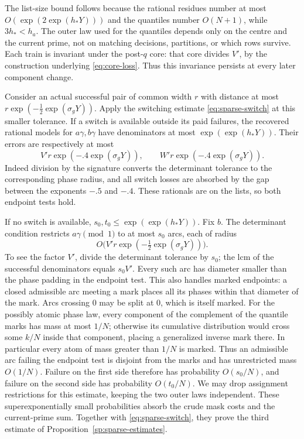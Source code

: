 The list-size bound follows because the rational residues number at most
$O(\exp(2\exp(h_*Y)))$ and the quantiles number $O(N+1)$, while
$3h_*<h_a$.  The outer law used for the quantiles depends only on the
centre and the current prime, not on matching decisions, partitions, or
which rows survive.  Each train is invariant under the post-$q$ core:
that core divides $V'$, by the construction underlying
\eqref{eq:core-loss}.  Thus this invariance persists at every later
component change.

Consider an actual successful pair of common width $r$ with distance at
most $r\exp(-\tfrac12\exp(\sigma_gY))$.  Apply the switching estimate
\eqref{eq:sparse-switch} at this smaller tolerance.  If a switch is
available outside its paid failures, the recovered rational models for
$a\gamma,b\gamma$ have denominators at most
$\exp(\exp(h_*Y))$.  Their errors are respectively at most
\[
 V'r\exp(-.4\exp(\sigma_gY)),\qquad
 W'r\exp(-.4\exp(\sigma_gY)).
\]
Indeed division by the signature converts the determinant tolerance
to the corresponding phase radius, and all switch losses are absorbed
by the gap between the exponents $-.5$ and $-.4$.  These rationals are
on the lists, so both endpoint tests hold.

If no switch is available, $s_0,t_0\le\exp(\exp(h_*Y))$.
Fix $b$.  The determinant condition restricts $a\gamma\pmod1$ to
at most $s_0$ arcs, each of radius
\[
 O\bigl(V'r\exp(-\tfrac12\exp(\sigma_gY))\bigr).
\]
To see the factor $V'$, divide the determinant tolerance by $s_0$;
the lcm of the successful denominators equals $s_0V'$.
Every such arc has diameter smaller than the phase padding in the
endpoint test.  This also handles marked endpoints: a closed
admissible arc meeting a mark places all its phases within that
diameter of the mark.  Arcs crossing $0$ may be split at $0$, which
is itself marked.  For the possibly atomic phase law, every component
of the complement of the quantile marks has mass at most $1/N$;
otherwise its cumulative distribution would cross some $k/N$
inside that component, placing a generalized inverse mark there.
In particular every atom of mass greater than $1/N$ is marked.
Thus an admissible arc failing the endpoint test is disjoint from
the marks and has unrestricted mass $O(1/N)$.  Failure on the first
side therefore has probability
$O(s_0/N)$, and failure on the second side has probability $O(t_0/N)$.
We may drop assignment restrictions for this estimate, keeping the
two outer laws independent.  These superexponentially small
probabilities absorb the crude mask costs and the current-prime sum.
Together with \eqref{eq:sparse-switch}, they prove the third estimate
of Proposition~\ref{sp:sparse-estimates}.

